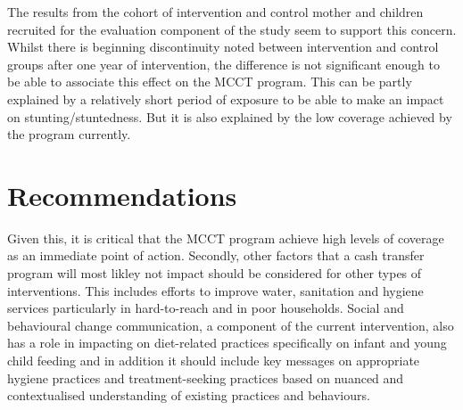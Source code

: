\documentclass[12pt,a4paper]{article}
\begin{document}
The results from the cohort of intervention and control mother and children recruited for the evaluation component of the study seem to support this concern. Whilst there is beginning discontinuity noted between intervention and control groups after one year of intervention, the difference is not significant enough to be able to associate this effect on the MCCT program. This can be partly explained by a relatively short period of exposure to be able to make an impact on stunting/stuntedness. But it is also explained by the low coverage achieved by the program currently.

\hypertarget{recommendations}{%
\section{Recommendations}\label{recommendations}}

Given this, it is critical that the MCCT program achieve high levels of coverage as an immediate point of action. Secondly, other factors that a cash transfer program will most likley not impact should be considered for other types of interventions. This includes efforts to improve water, sanitation and hygiene services particularly in hard-to-reach and in poor households. Social and behavioural change communication, a component of the current intervention, also has a role in impacting on diet-related practices specifically on infant and young child feeding and in addition it should include key messages on appropriate hygiene practices and treatment-seeking practices based on nuanced and contextualised understanding of existing practices and behaviours.

\renewcommand\refname{References}

\end{document}
